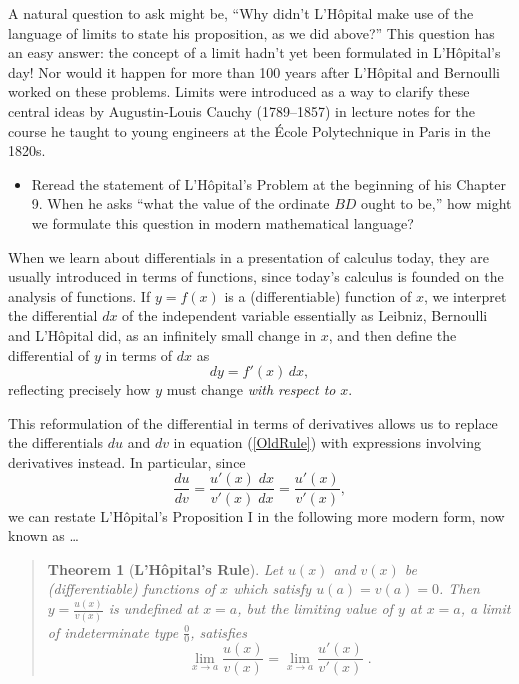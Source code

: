 \documentclass[11pt]{article}
\newtheorem*{thm*}{Theorem}
\newcounter{tasknumb}
\newcommand{\tasknumb}[1]{\refstepcounter{tasknumb}\textmd{\textbf{$\fbox{$\fbox{Task \thetasknumb}$}$}}#1}
\newenvironment{task}[1][]%
 {\begin{itemize}
 \item[\tasknumb{#1}] }
{
    \end{itemize}    }%
\begin{document}
\bigskip
A natural question to ask might be, ``Why didn't L'H\^opital make use of the language of limits to state his proposition, as we did above?'' This question has an easy answer: the concept of a limit hadn't yet been formulated in L'H\^opital's day! Nor would it happen for more than 100 years after L'H\^opital and Bernoulli worked on these problems. Limits were introduced as a way to clarify these central ideas by Augustin-Louis Cauchy (1789--1857) in lecture notes for the course he taught to young engineers at the \'Ecole Polytechnique in Paris in the 1820s.

\begin{task}
Reread the statement of L'H\^opital's Problem at the beginning of his Chapter 9. When he asks ``what the value of the ordinate $BD$ ought to be,'' how might we formulate this question in modern mathematical language?
\end{task}

\bigskip
When we learn about differentials in a presentation of calculus today, they are usually introduced in terms of functions, since today's calculus is founded on the analysis of functions. If $y=f(x)$ is a (differentiable) function of $x$, we interpret the differential $dx$ of the independent variable essentially as Leibniz, Bernoulli and L'H\^opital did, as an infinitely small change in $x$, and then define the differential of $y$ in terms of $dx$ as
\begin{equation} \label{eqn4}
dy=f'(x)\,dx,
\end{equation}
reflecting precisely how $y$ must change \emph{with respect to} $x$.

This reformulation of the differential in terms of derivatives allows us to replace the differentials $du$ and $dv$ in equation (\ref{OldRule}) with expressions involving derivatives instead. In particular, since $$\frac{du}{dv}=\frac{u'(x)\;dx}{v'(x)\;dx}=\frac{u'(x)}{v'(x)},$$we can restate L'H\^opital's Proposition I in the following more modern form, now known as \dots

\vspace{-0.25in}
\begin{quote}
\begin{thm*}[{\bf L'H\^opital's Rule}]
Let $u(x)$ and $v(x)$ be (differentiable) functions of $x$ which satisfy $u(a)=v(a)=0$. Then ${\displaystyle y=\frac{u(x)}{v(x)}}$ is undefined at $x=a$, but the limiting value of $y$ at $x=a$, a limit of indeterminate type ${\displaystyle \frac00}$, satisfies
	\begin{equation}\label{LR}
	\lim_{x\to a} \frac{u(x)}{v(x)}=\lim_{x\to a} \frac{u'(x)}{v'(x)}\;.
	\end{equation}
\end{thm*}
\end{quote}
\end{document}
